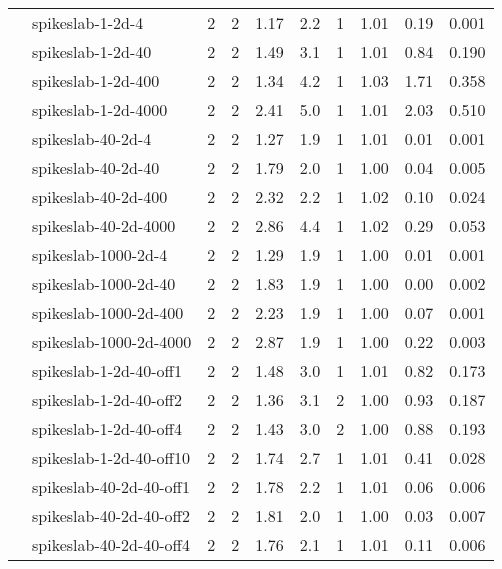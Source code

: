 \begin{tabular}{ll|rrcccccc}
                     & spikeslab-1-2d-4     & 2   & 2    & 1.17 & 2.2 &    1 & 1.01 & 0.19 & 0.001 \\
                     & spikeslab-1-2d-40    & 2   & 2    & 1.49 & 3.1 &    1 & 1.01 & 0.84 & 0.190 \\
                     & spikeslab-1-2d-400   & 2   & 2    & 1.34 & 4.2 &    1 & 1.03 & 1.71 & 0.358 \\
                     & spikeslab-1-2d-4000  & 2   & 2    & 2.41 & 5.0 &    1 & 1.01 & 2.03 & 0.510 \\
                     & spikeslab-40-2d-4    & 2   & 2    & 1.27 & 1.9 &    1 & 1.01 & 0.01 & 0.001 \\
                     & spikeslab-40-2d-40   & 2   & 2    & 1.79 & 2.0 &    1 & 1.00 & 0.04 & 0.005 \\
                     & spikeslab-40-2d-400  & 2   & 2    & 2.32 & 2.2 &    1 & 1.02 & 0.10 & 0.024 \\
                     & spikeslab-40-2d-4000 & 2   & 2    & 2.86 & 4.4 &    1 & 1.02 & 0.29 & 0.053 \\
                     & spikeslab-1000-2d-4  & 2   & 2    & 1.29 & 1.9 &    1 & 1.00 & 0.01 & 0.001 \\
                     & spikeslab-1000-2d-40 & 2   & 2    & 1.83 & 1.9 &    1 & 1.00 & 0.00 & 0.002 \\
                     & spikeslab-1000-2d-400 & 2   & 2    & 2.23 & 1.9 &    1 & 1.00 & 0.07 & 0.001 \\
                     & spikeslab-1000-2d-4000 & 2   & 2    & 2.87 & 1.9 &    1 & 1.00 & 0.22 & 0.003 \\
                     & spikeslab-1-2d-40-off1 & 2   & 2    & 1.48 & 3.0 &    1 & 1.01 & 0.82 & 0.173 \\
                     & spikeslab-1-2d-40-off2 & 2   & 2    & 1.36 & 3.1 &    2 & 1.00 & 0.93 & 0.187 \\
                     & spikeslab-1-2d-40-off4 & 2   & 2    & 1.43 & 3.0 &    2 & 1.00 & 0.88 & 0.193 \\
                     & spikeslab-1-2d-40-off10 & 2   & 2    & 1.74 & 2.7 &    1 & 1.01 & 0.41 & 0.028 \\
                     & spikeslab-40-2d-40-off1 & 2   & 2    & 1.78 & 2.2 &    1 & 1.01 & 0.06 & 0.006 \\
                     & spikeslab-40-2d-40-off2 & 2   & 2    & 1.81 & 2.0 &    1 & 1.00 & 0.03 & 0.007 \\
                     & spikeslab-40-2d-40-off4 & 2   & 2    & 1.76 & 2.1 &    1 & 1.01 & 0.11 & 0.006 \\

\end{tabular}
